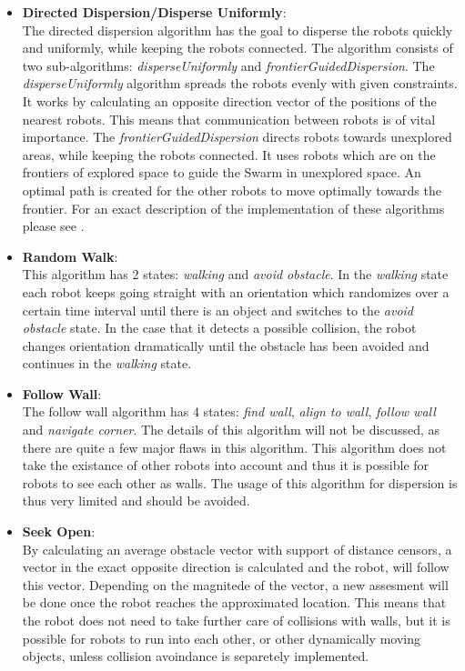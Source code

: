 	\begin{itemize}
		\item \textbf{Directed Dispersion/Disperse Uniformly}\cite{mclurkin2007distributed}:\\
			The directed dispersion algorithm has the goal to disperse the robots quickly and uniformly, while keeping the robots connected. The algorithm consists of two sub-algorithms: \emph{disperseUniformly} and \emph{frontierGuidedDispersion}. The \emph{disperseUniformly} algorithm spreads the robots evenly with given constraints. It works by calculating an opposite direction vector of the positions of the nearest robots. This means that communication between robots is of vital importance. The \emph{frontierGuidedDispersion} directs robots towards unexplored areas, while keeping the robots connected. It uses robots which are on the frontiers of explored space to guide the Swarm in unexplored space. An optimal path is created for the other robots to move optimally towards the frontier. For an exact description of the implementation of these algorithms please see \cite{mclurkin2007distributed}.
		\item \textbf{Random Walk}\cite{morlok2007dispersing}:\\
			This algorithm has 2 states: \emph{walking} and \emph{avoid obstacle}. In the \emph{walking} state each robot keeps going straight with an orientation which randomizes over a certain time interval until there is an object and switches to the \emph{avoid obstacle} state. In the case that it detects a possible collision, the robot changes orientation dramatically until the obstacle has been avoided and continues in the \emph{walking} state.
		\item \textbf{Follow Wall}\cite{morlok2007dispersing}:\\
			The follow wall algorithm has 4 states: \emph{find wall}, \emph{align to wall}, \emph{follow wall} and \emph{navigate corner}. The details of this algorithm will not be discussed, as there are quite a few major flaws in this algorithm. This algorithm does not take the existance of other robots into account and thus it is possible for robots to see each other as walls. The usage of this algorithm for dispersion is thus very limited and should be avoided.
		\item \textbf{Seek Open}\cite{morlok2007dispersing}:\\
			By calculating an average obstacle vector with support of distance censors, a vector in the exact opposite direction is calculated and the robot, will follow this vector. Depending on the magnitede of the vector, a new assesment will be done once the robot reaches the approximated location. This means that the robot does not need to take further care of collisions with walls, but it is possible for robots to run into each other, or other dynamically moving objects, unless collision avoindance is separetely implemented.

\end{itemize}
